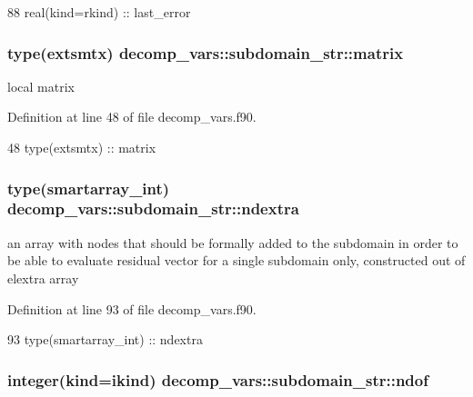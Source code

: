 \begin{DoxyCode}
88     \textcolor{keywordtype}{real(kind=rkind)} :: last\_error
\end{DoxyCode}
\subsubsection[{matrix}]{\setlength{\rightskip}{0pt plus 5cm}type({\bf extsmtx}) decomp\+\_\+vars\+::subdomain\+\_\+str\+::matrix}\label{structdecomp__vars_1_1subdomain__str_abaf142c71cbfb282704f78141061d535}


local matrix 



Definition at line 48 of file decomp\+\_\+vars.\+f90.


\begin{DoxyCode}
48     \textcolor{keywordtype}{type}(extsmtx) :: matrix
\end{DoxyCode}
\subsubsection[{ndextra}]{\setlength{\rightskip}{0pt plus 5cm}type({\bf smartarray\+\_\+int}) decomp\+\_\+vars\+::subdomain\+\_\+str\+::ndextra}\label{structdecomp__vars_1_1subdomain__str_a8859cb211dfc8e8dc06151df70241d21}


an array with nodes that should be formally added to the subdomain in order to be able to evaluate residual vector for a single subdomain only, constructed out of \textquotesingle{}elextra\textquotesingle{} array 



Definition at line 93 of file decomp\+\_\+vars.\+f90.


\begin{DoxyCode}
93     \textcolor{keywordtype}{type}(smartarray_int) :: ndextra
\end{DoxyCode}
\subsubsection[{ndof}]{\setlength{\rightskip}{0pt plus 5cm}integer(kind=ikind) decomp\+\_\+vars\+::subdomain\+\_\+str\+::ndof}\label{structdecomp__vars_1_1subdomain__str_a0c3506471203085679a382d6d89e9322}


